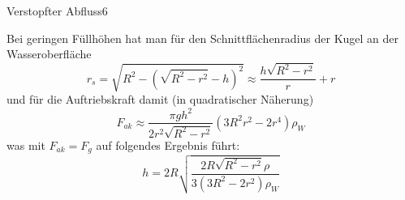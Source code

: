 \begin{problem}{Verstopfter Abfluss}{6}
\begin{solution}
\[\]
Bei geringen Füllhöhen hat man für den Schnittflächenradius der Kugel an der Wasseroberfläche
\[
r_s = \sqrt{ {R}^{2}  - {\left( \sqrt{ {R}^{2}  - {r}^{2}  } - h \right)}^{2}} \approx \frac{{h \sqrt{ {R}^{2}  - {r}^{2}  }}}{r} + r
\]
und für die Auftriebskraft damit (in quadratischer Näherung)
\[
F_{ak} \approx \frac{\pi g h^2}{2 r^2 \sqrt{R^2 - r^2}} \left( 3 R^2 r^2 - 2 r^4 \right) \rho_{W}
\]
was mit $F_{ak} = F_g$ auf folgendes Ergebnis führt:
\[
h  =  2 R  \sqrt{ \frac{2 R \sqrt{R^2 - r^2} \rho}{3( 3 R^2 - 2 r^2 ) \rho_W } }
\]
\end{solution}
\end{problem}

